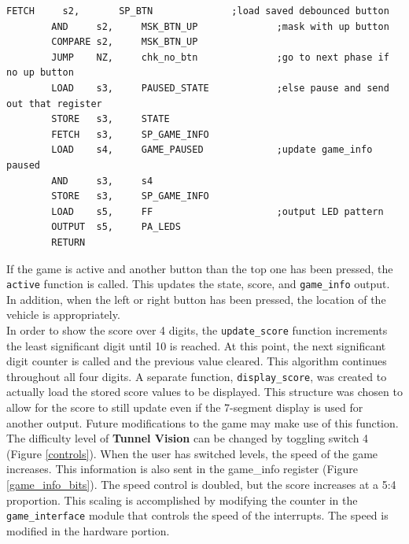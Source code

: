 \documentclass[11pt]{article}
\begin{document}
\begin{lstlisting}[caption=Function checking if the top button has been pushed, label=chk_up_btn]		
		FETCH	  s2,		SP_BTN				;load saved debounced button
		AND		s2,		MSK_BTN_UP				;mask with up button
		COMPARE s2,		MSK_BTN_UP
		JUMP 	NZ, 	chk_no_btn				;go to next phase if no up button
		LOAD 	s3,		PAUSED_STATE			;else pause and send out that register
		STORE	s3,		STATE
		FETCH	s3,		SP_GAME_INFO
		LOAD 	s4,	    GAME_PAUSED        		;update game_info paused	
		AND		s3,		s4						
		STORE	s3,		SP_GAME_INFO
		LOAD	s5,		FF						;output LED pattern
		OUTPUT	s5,		PA_LEDS
		RETURN	
 \end{lstlisting}

\hspace{16pt}If the game is active and another button than the top one has been pressed, the \texttt{active} function is called.  This updates the state, score, and \texttt{game\_info} output.  In addition, when the left or right button has been pressed, the location of the vehicle is appropriately.\\


\hspace{16pt}In order to show the score over 4 digits, the \texttt{update\_score} function increments the least significant digit until 10 is reached.  At this point, the next significant digit counter is called and the previous value cleared.  This algorithm continues throughout all four digits. A separate function, \texttt{display\_score}, was created to actually load the stored score values to be displayed.  This structure was chosen to allow for the score to still update even if the 7-segment display is used for another output.  Future modifications to the game may make use of this function.\\		

\hspace{16pt} The difficulty level of \textbf{Tunnel Vision} can be changed by toggling switch 4 (Figure \ref{controls}). When the user has switched levels, the speed of the game increases.  This information is also sent in the game\_info register (Figure \ref{game_info_bits}).  The speed control is doubled, but the score increases at a 5:4 proportion.  This scaling is accomplished by modifying the counter in the \texttt{game\_interface} module that controls the speed of the interrupts. The speed is modified in the hardware portion.\\
\end{document}
